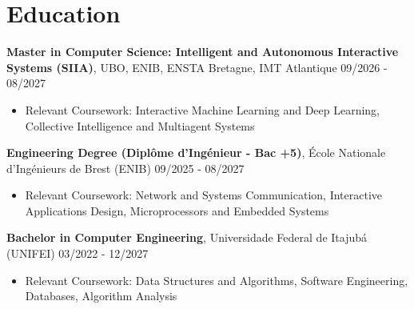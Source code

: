 \documentclass[10pt,a4paper]{article}
\begin{document}
\section{Education}
\noindent
\textbf{\color{primary} Master in Computer Science: Intelligent and Autonomous Interactive Systems (SIIA)}, UBO, ENIB, ENSTA Bretagne, IMT Atlantique \hfill {\small\color{subtext} 09/2026 - 08/2027}
\begin{itemize}
    \item \small Relevant Coursework: Interactive Machine Learning and Deep Learning, Collective Intelligence and Multiagent Systems
\end{itemize}
\noindent
\textbf{\color{primary} Engineering Degree (Diplôme d'Ingénieur - Bac +5)}, École Nationale d'Ingénieurs de Brest (ENIB) \hfill {\small\color{subtext} 09/2025 - 08/2027}
\begin{itemize}
    \item \small Relevant Coursework: Network and Systems Communication, Interactive Applications Design, Microprocessors and Embedded Systems
\end{itemize}
\noindent
\textbf{\color{primary} Bachelor in Computer Engineering}, Universidade Federal de Itajubá (UNIFEI) \hfill {\small\color{subtext} 03/2022 - 12/2027}
\begin{itemize}
    \item \small Relevant Coursework: Data Structures and Algorithms, Software Engineering, Databases, Algorithm Analysis
\end{itemize}

\end{document}
